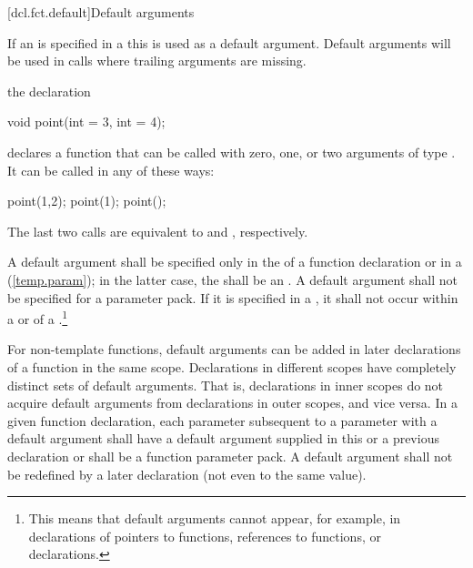 [dcl.fct.default]{Default arguments}%

\pnum
If an  is specified in a
 this
is used as a default argument.
Default arguments will be used in calls where trailing arguments are missing.

\pnum
{}%
\enterexample
the declaration

\begin{codeblock}
void point(int = 3, int = 4);
\end{codeblock}

declares a function that can be called with zero, one, or two arguments of type
.
It can be called in any of these ways:

\begin{codeblock}
point(1,2);  point(1);  point();
\end{codeblock}

The last two calls are equivalent to
and
,
respectively.
\exitexample

\pnum
A default argument shall be specified only in the
of a function declaration or in a
(\ref{temp.param});
in the latter case, the  shall be an
.
A default argument shall not be specified for a parameter pack.
If it is specified in a
,
it shall not occur within a
or
of a
.\footnote{This means that default
arguments cannot appear,
for example, in declarations of pointers to functions,
references to functions, or
declarations.
}

\pnum
For non-template functions, default arguments can be added in later
declarations of a
function in the same scope.
Declarations in different
scopes have completely distinct sets of default arguments.
That
is, declarations in inner scopes do not acquire default
arguments from declarations in outer scopes, and vice versa.
In
a given function declaration, each parameter subsequent to a
parameter with a default argument shall have a default argument
supplied in this or a previous declaration
or shall be a function parameter pack.
A default argument
shall not be redefined by a later declaration (not even to the
same value).
\enterexample


